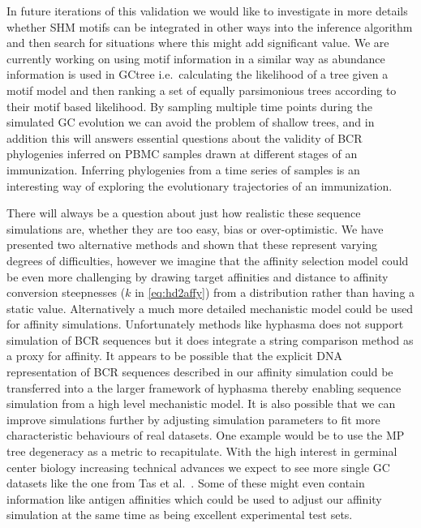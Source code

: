 In future iterations of this validation we would like to investigate in more details whether SHM motifs can be integrated in other ways into the inference algorithm and then search for situations where this might add significant value.
We are currently working on using motif information in a similar way as abundance information is used in GCtree i.e.\ calculating the likelihood of a tree given a motif model and then ranking a set of equally parsimonious trees according to their motif based likelihood.
By sampling multiple time points during the simulated GC evolution we can avoid the problem of shallow trees, and in addition this will answers essential questions about the validity of BCR phylogenies inferred on PBMC samples drawn at different stages of an immunization.
Inferring phylogenies from a time series of samples is an interesting way of exploring the evolutionary trajectories of an immunization.

There will always be a question about just how realistic these sequence simulations are, whether they are too easy, bias or over-optimistic.
We have presented two alternative methods and shown that these represent varying degrees of difficulties, however we imagine that the affinity selection model could be even more challenging by drawing target affinities and distance to affinity conversion steepnesses ($k$ in \eqref{eq:hd2affy}) from a distribution rather than having a static value.
Alternatively a much more detailed mechanistic model could be used for affinity simulations.
Unfortunately methods like hyphasma \cite{robert2017simulate} does not support simulation of BCR sequences but it does integrate a string comparison method as a proxy for affinity.
It appears to be possible that the explicit DNA representation of BCR sequences described in our affinity simulation could be transferred into a the larger framework of hyphasma thereby enabling sequence simulation from a high level mechanistic model.
It is also possible that we can improve simulations further by adjusting simulation parameters to fit more characteristic behaviours of real datasets.
One example would be to use the MP tree degeneracy as a metric to recapitulate.
With the high interest in germinal center biology increasing technical advances we expect to see more single GC datasets like the one from Tas et al.\ \cite{tas2016visualizing}.
Some of these might even contain information like antigen affinities which could be used to adjust our affinity simulation at the same time as being excellent experimental test sets.


